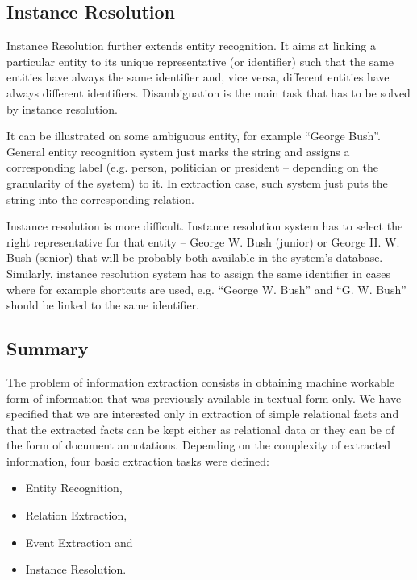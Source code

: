 \subsection{Instance Resolution} \label{sec:problems_instance_resolution}

Instance Resolution further extends entity recognition. It aims at linking a particular entity to its unique representative (or identifier) such that the same entities have always the same identifier and, vice versa, different entities have always different identifiers. Disambiguation is the main task that has to be solved by instance resolution.

It can be illustrated on some ambiguous entity, for example ``George Bush”. General entity recognition system just marks the string and assigns a corresponding label (e.g. person, politician or president -- depending on the granularity of the system) to it. In extraction case, such system just puts the string into the corresponding relation. 

Instance resolution is more difficult. Instance resolution system has to select the right representative for that entity -- George W. Bush (junior) or George H. W. Bush (senior) that will be probably both available in the system’s database. Similarly, instance resolution system has to assign the same identifier in cases where for example shortcuts are used, e.g. “George W. Bush” and “G. W. Bush” should be linked to the same identifier.

\subsection{Summary}

The problem of information extraction consists in obtaining machine workable form of information that was previously available in textual form only. We have specified that we are interested only in extraction of simple relational facts and that the extracted facts can be kept either as relational data or they can be of the form of document annotations. Depending on the complexity of extracted information, four basic extraction tasks were defined:

\begin{itemize}
	\item Entity Recognition,
	\item Relation Extraction,
	\item Event Extraction and
	\item Instance Resolution.
\end{itemize}

